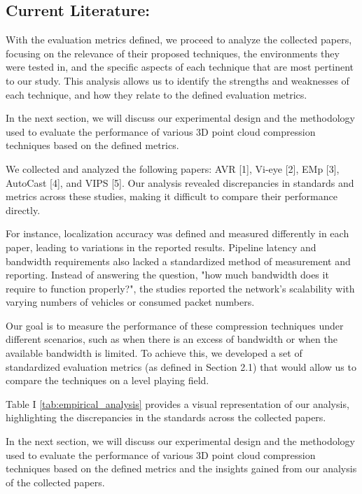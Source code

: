 \documentclass[conference]{IEEEtran}
\begin{document}
\subsection{Current Literature:}

With the evaluation metrics defined, we proceed to analyze the collected papers, focusing on the relevance of their proposed techniques, the environments they were tested in, and the specific aspects of each technique that are most pertinent to our study. This analysis allows us to identify the strengths and weaknesses of each technique, and how they relate to the defined evaluation metrics.

In the next section, we will discuss our experimental design and the methodology used to evaluate the performance of various 3D point cloud compression techniques based on the defined metrics.


We collected and analyzed the following papers: AVR [1], Vi-eye [2], EMp [3], AutoCast [4], and VIPS [5]. Our analysis revealed discrepancies in standards and metrics across these studies, making it difficult to compare their performance directly.

For instance, localization accuracy was defined and measured differently in each paper, leading to variations in the reported results. Pipeline latency and bandwidth requirements also lacked a standardized method of measurement and reporting. Instead of answering the question, "how much bandwidth does it require to function properly?", the studies reported the network's scalability with varying numbers of vehicles or consumed packet numbers.

Our goal is to measure the performance of these compression techniques under different scenarios, such as when there is an excess of bandwidth or when the available bandwidth is limited. To achieve this, we developed a set of standardized evaluation metrics (as defined in Section 2.1) that would allow us to compare the techniques on a level playing field.

Table I \ref{tab:empirical_analysis} provides a visual representation of our analysis, highlighting the discrepancies in the standards across the collected papers.

In the next section, we will discuss our experimental design and the methodology used to evaluate the performance of various 3D point cloud compression techniques based on the defined metrics and the insights gained from our analysis of the collected papers.

\end{document}
